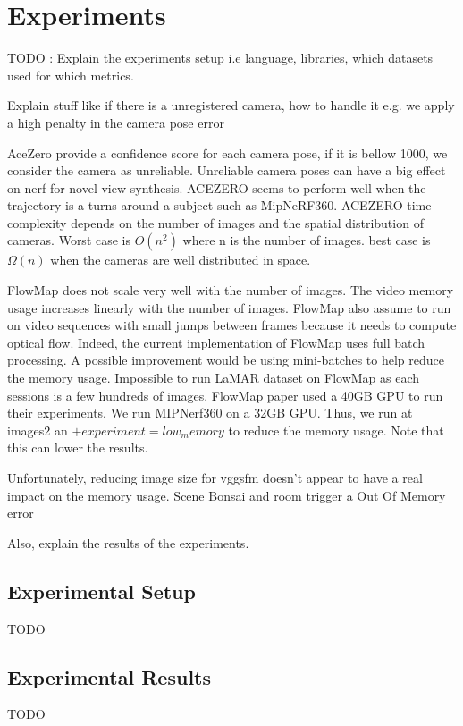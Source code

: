 \chapter{Experiments}\label{chap:experiments}

TODO : 
Explain the experiments setup i.e language, libraries, which datasets used for which metrics. 

Explain stuff like if there is a unregistered camera, how to handle it e.g. we apply a high penalty in the camera pose error

AceZero provide a confidence score for each camera pose, if it is bellow 1000, we consider the camera as unreliable.
Unreliable camera poses can have a big effect on nerf for novel view synthesis.
ACEZERO seems to perform well when the trajectory is a turns around a subject such as MipNeRF360.
ACEZERO time complexity depends on the number of images and the spatial distribution of cameras. Worst case is $O(n^2)$ where n is the number of images. best case is $\Omega(n)$ when the cameras are well distributed in space.

FlowMap does not scale very well with the number of images. The video memory usage increases linearly with the number of images.
FlowMap also assume to run on video sequences with small jumps between frames because it needs to compute optical flow.
Indeed, the current implementation of FlowMap uses full batch processing. A possible improvement would be using mini-batches to help reduce the memory usage.
Impossible to run LaMAR dataset on FlowMap as each sessions is a few hundreds of images.
FlowMap paper used a 40GB GPU to run their experiments. We run MIPNerf360 on a 32GB GPU. Thus, we run at images2 an $+experiment=low_memory$ to reduce the memory usage. Note that this can lower the results.


Unfortunately, reducing image size for vggsfm doesn't appear to have a real impact on the memory usage. Scene Bonsai and room trigger a Out Of Memory error


Also, explain the results of the experiments.

\section{Experimental Setup}\label{sec:experimental-setup}
TODO

\section{Experimental Results}\label{sec:experimental-results}
TODO

